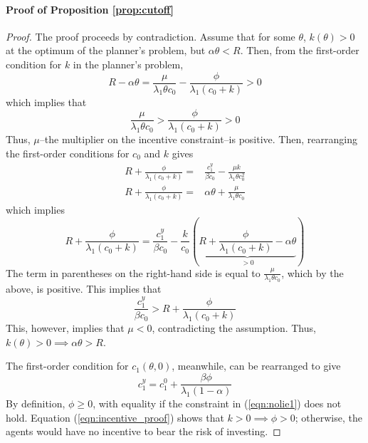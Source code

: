 \documentclass[11pt]{article}
\begin{document}
\paragraph{Proof of Proposition \ref{prop:cutoff}}
\begin{proof}
    The proof proceeds by contradiction. Assume that for some $\theta$,
$k\left(\theta\right)>0$ at the optimum of the planner's problem,
but $\alpha\theta<R$. Then, from the first-order condition for $k$
in the planner's problem, 
\[
R-\alpha\theta=\frac{\mu}{\lambda_{1}\theta c_{0}}-\frac{\phi}{\lambda_{1}\left(c_{0}+k\right)}>0
\]
which implies that 
\[
\frac{\mu}{\lambda_{1}\theta c_{0}}>\frac{\phi}{\lambda_{1}\left(c_{0}+k\right)}>0
\]
Thus, $\mu$--the multiplier on the incentive constraint--is positive.
Then, rearranging the first-order conditions for $c_{0}$ and $k$
gives
\begin{align*}
R+\frac{\phi}{\lambda_{1}\left(c_{0}+k\right)}= & \frac{c_{1}^{y}}{\beta c_{0}}-\frac{\mu k}{\lambda_{1}\theta c_{0}^{2}}\\
R+\frac{\phi}{\lambda_{1}\left(c_{0}+k\right)}= & \alpha\theta+\frac{\mu}{\lambda_{1}\theta c_{0}}
\end{align*}
which implies
\[
R+\frac{\phi}{\lambda_{1}\left(c_{0}+k\right)}=\frac{c_{1}^{y}}{\beta c_{0}}-\frac{k}{c_{0}}\left(\underbrace{R+\frac{\phi}{\lambda_{1}\left(c_{0}+k\right)}-\alpha\theta}_{>0}\right)
\]
The term in parentheses on the right-hand side is equal to $\frac{\mu}{\lambda_{1}\theta c_{0}}$,
which by the above, is positive. This implies that 
\[
\frac{c_{1}^{y}}{\beta c_{0}}>R+\frac{\phi}{\lambda_{1}\left(c_{0}+k\right)}
\]
This, however, implies that $\mu<0$, contradicting the assumption.
Thus, $k\left(\theta\right)>0\implies\alpha\theta>R$.

The first-order condition for $c_{1}\left(\theta,0\right)$, meanwhile,
can be rearranged to give 
\begin{equation}
    c_{1}^{y}=c_{1}^{0}+\frac{\beta\phi}{\lambda_{1}\left(1-\alpha\right)} \label{eqn:incentive_proof}
\end{equation}
By definition, $\phi\ge0$, with equality if the constraint in (\ref{eqn:nolie1})
does not hold. Equation (\ref{eqn:incentive_proof}) shows that $k>0\implies\phi>0$;
otherwise, the agents would have no incentive to bear the risk of
investing. 
\end{proof}
\end{document}
